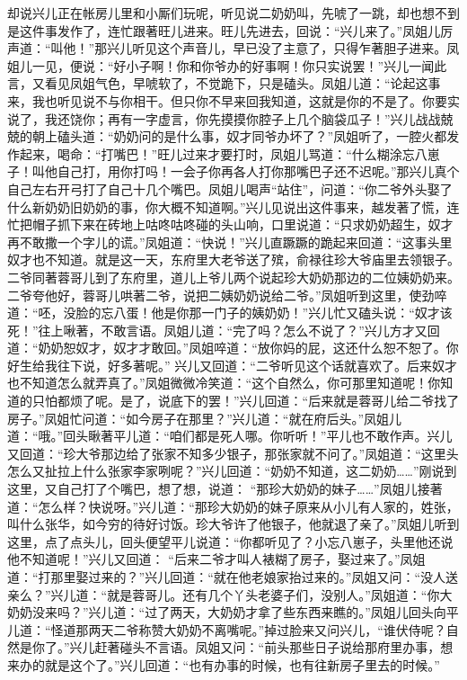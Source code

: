 \begin{parag}
    却说兴儿正在帐房儿里和小厮们玩呢，听见说二奶奶叫，先唬了一跳，却也想不到是这件事发作了，连忙跟著旺儿进来。旺儿先进去，回说：“兴儿来了。”凤姐儿厉声道：“叫他！”那兴儿听见这个声音儿，早已没了主意了，只得乍著胆子进来。凤姐儿一见，便说：“好小子啊！你和你爷办的好事啊！你只实说罢！”兴儿一闻此言，又看见凤姐气色，早唬软了，不觉跪下，只是磕头。凤姐儿道：“论起这事来，我也听见说不与你相干。但只你不早来回我知道，这就是你的不是了。你要实说了，我还饶你；再有一字虚言，你先摸摸你腔子上几个脑袋瓜子！”兴儿战战兢兢的朝上磕头道：“奶奶问的是什么事，奴才同爷办坏了？”凤姐听了，一腔火都发作起来，喝命：“打嘴巴！”旺儿过来才要打时，凤姐儿骂道：“什么糊涂忘八崽子！叫他自己打，用你打吗！一会子你再各人打你那嘴巴子还不迟呢。”那兴儿真个自己左右开弓打了自己十几个嘴巴。凤姐儿喝声“站住”，问道：“你二爷外头娶了什么新奶奶旧奶奶的事，你大概不知道啊。”兴儿见说出这件事来，越发著了慌，连忙把帽子抓下来在砖地上咕咚咕咚碰的头山响，口里说道：“只求奶奶超生，奴才再不敢撒一个字儿的谎。”凤姐道：“快说！”兴儿直蹶蹶的跪起来回道：“这事头里奴才也不知道。就是这一天，东府里大老爷送了殡，俞禄往珍大爷庙里去领银子。二爷同著蓉哥儿到了东府里，道儿上爷儿两个说起珍大奶奶那边的二位姨奶奶来。二爷夸他好，蓉哥儿哄著二爷，说把二姨奶奶说给二爷。”凤姐听到这里，使劲啐道：“呸，没脸的忘八蛋！他是你那一门子的姨奶奶！”兴儿忙又磕头说：“奴才该死！”往上啾著，不敢言语。凤姐儿道：“完了吗？怎么不说了？”兴儿方才又回道：“奶奶恕奴才，奴才才敢回。”凤姐啐道：“放你妈的屁，这还什么恕不恕了。你好生给我往下说，好多著呢。” 兴儿又回道：“二爷听见这个话就喜欢了。后来奴才也不知道怎么就弄真了。”凤姐微微冷笑道：“这个自然么，你可那里知道呢！你知道的只怕都烦了呢。是了，说底下的罢！”兴儿回道：“后来就是蓉哥儿给二爷找了房子。”凤姐忙问道：“如今房子在那里？”兴儿道：“就在府后头。”凤姐儿道：“哦。”回头瞅著平儿道：“咱们都是死人哪。你听听！”平儿也不敢作声。兴儿又回道：“珍大爷那边给了张家不知多少银子，那张家就不问了。”凤姐道：“这里头怎么又扯拉上什么张家李家咧呢？”兴儿回道：“奶奶不知道，这二奶奶……”刚说到这里，又自己打了个嘴巴，想了想，说道： “那珍大奶奶的妹子……”凤姐儿接著道：“怎么样？快说呀。”兴儿道：“那珍大奶奶的妹子原来从小儿有人家的，姓张，叫什么张华，如今穷的待好讨饭。珍大爷许了他银子，他就退了亲了。”凤姐儿听到这里，点了点头儿，回头便望平儿说道：“你都听见了？小忘八崽子，头里他还说他不知道呢！”兴儿又回道： “后来二爷才叫人裱糊了房子，娶过来了。”凤姐道：“打那里娶过来的？”兴儿回道：“就在他老娘家抬过来的。”凤姐又问：“没人送亲么？”兴儿道：“就是蓉哥儿。还有几个丫头老婆子们，没别人。”凤姐道：“你大奶奶没来吗？”兴儿道：“过了两天，大奶奶才拿了些东西来瞧的。”凤姐儿回头向平儿道：“怪道那两天二爷称赞大奶奶不离嘴呢。”掉过脸来又问兴儿，“谁伏侍呢？自然是你了。”兴儿赶著碰头不言语。凤姐又问：“前头那些日子说给那府里办事，想来办的就是这个了。”兴儿回道：“也有办事的时候，也有往新房子里去的时候。”
\end{parag}


